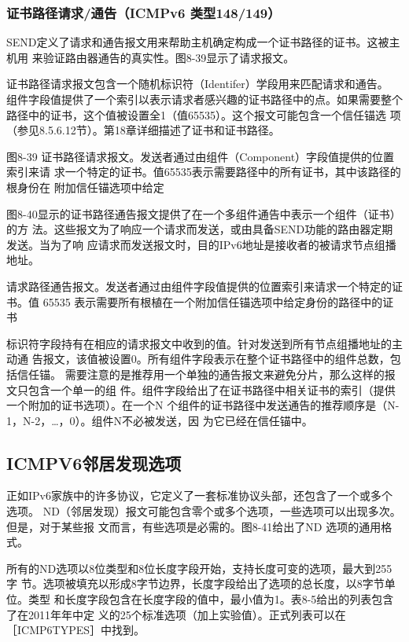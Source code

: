 \subsubsection{证书路径请求/通告（ICMPv6 类型148/149）}
SEND定义了请求和通告报文用来帮助主机确定构成一个证书路径的证书。这被主机用
来验证路由器通告的真实性。图8-39显示了请求报文。

证书路径请求报文包含一个随机标识符（Identifer）学段用来匹配请求和通告。
组件字段值提供了一个索引以表示请求者感兴趣的证书路径中的点。如果需要整个
路径中的证书，这个值被设置全1（值65535）。这个报文可能包含一个信任锚选
项（参见8.5.6.12节）。第18章详细描述了证书和证书路径。

图8-39 证书路径请求报文。发送者通过由组件（Component）字段值提供的位置索引来请
求一个特定的证书。值65535表示需要路径中的所有证书，其中该路径的根身份在
附加信任锚选项中给定

图8-40显示的证书路径通告报文提供了在一个多组件通告中表示一个组件（证书）的方
法。这些报文为了响应一个请求而发送，或由具备SEND功能的路由器定期发送。当为了响
应请求而发送报文时，目的IPv6地址是接收者的被请求节点组播地址。

请求路径通告报文。发送者通过由组件字段值提供的位置索引来请求一个特定的证书。值
65535 表示需要所有根植在一个附加信任锚选项中给定身份的路径中的证书

标识符字段持有在相应的请求报文中收到的值。针对发送到所有节点组播地址的主动通
告报文，该值被设置0。所有组件字段表示在整个证书路径中的组件总数，包括信任锚。
需要注意的是推荐用一个单独的通告报文来避免分片，那么这样的报文只包含一个单一的组
件。组件字段给出了在证书路径中相关证书的索引（提供一个附加的证书选项）。在一个N
个组件的证书路径中发送通告的推荐顺序是（N-1，N-2，\dots，0）。组件N不必被发送，因
为它已经在信任锚中。

\subsection{ICMPV6邻居发现选项}
正如IPv6家族中的许多协议，它定义了一套标准协议头部，还包含了一个或多个选项。
ND（邻居发现）报文可能包含零个或多个选项，一些选项可以出现多次。但是，对于某些报
文而言，有些选项是必需的。图8-41给出了ND 选项的通用格式。

所有的ND选项以8位类型和8位长度字段开始，支持长度可变的选项，最大到255字
节。选项被填充以形成8字节边界，长度字段给出了选项的总长度，以8字节单位。类型
和长度字段包含在长度字段的值中，最小值为1。表8-5给出的列表包含了在2011年年中定
义的25个标准选项（加上实验值）。正式列表可以在［ICMP6TYPES］中找到。

